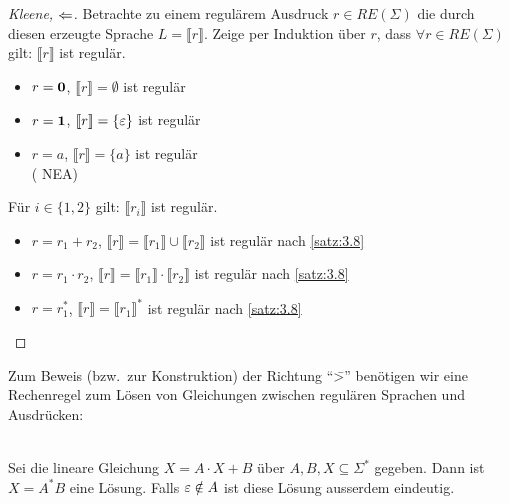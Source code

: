 \begin{proof}[Kleene, $\<=$]
Betrachte zu einem regulärem Ausdruck $r\in RE(\Sigma)$ die durch diesen erzeugte Sprache $L=\llbracket r \rrbracket$. Zeige per Induktion über $r$, dass $ \forall r\in RE(\Sigma) $ gilt: $ \llbracket r \rrbracket$ ist regulär.
    	\begin{description}[font=\normalfont]
      \item[I.A.:] \hfill
        \vspace{-\baselineskip}
        \begin{itemize}
        \item $r = \mathbf{0}$, $\llbracket r \rrbracket = \emptyset$ ist regulär
        \item $r = \mathbf{1}$, $[\![ r ]\!] = \{ \varepsilon \}$ ist regulär
        \item $r = a$, $\llbracket r \rrbracket = \{ a \}$ ist regulär \\
          (
    			 \quad\acs{NEA}) 
        \end{itemize}
        \item[I.V.:] Für $i \in \{1, 2\}$ gilt: $\llbracket r_i \rrbracket$ ist regulär.
    		\item[I.S.:] \hfill
          \vspace{-\baselineskip}
          \begin{itemize}
          \item $r = r_1 + r_2$, $\llbracket r \rrbracket = \llbracket r_1 \rrbracket \cup \llbracket r_2 \rrbracket$ ist regulär nach \autoref{satz:3.8}
          \item $r = r_1 \cdot r_2$, $\llbracket r \rrbracket = \llbracket r_1 \rrbracket \cdot \llbracket r_2 \rrbracket$ ist regulär nach \autoref{satz:3.8}
          \item $r = r_1^*$, $\llbracket r \rrbracket = \llbracket r_1 \rrbracket^*$ ist regulär nach \autoref{satz:3.8}
          \end{itemize}
		\end{description}
\end{proof}

Zum Beweis (bzw.\ zur Konstruktion) der Richtung "`\=>"' benötigen wir eine Rechenregel zum Lösen von Gleichungen zwischen regulären Sprachen und Ausdrücken:
\begin{lemma}\label{lem:arden}\ \\
        Sei die lineare Gleichung $X=A\cdot X+B$ über $A, B, X\subseteq \Sigma^*$ gegeben. Dann ist $X=A^*B$ eine Lösung. Falls $\varepsilon \notin A$ ist diese Lösung ausserdem eindeutig.
\end{lemma}

